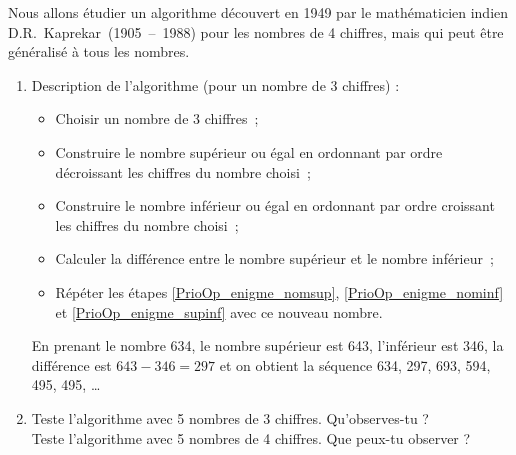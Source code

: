 \begin{enigme}

Nous allons étudier un algorithme découvert en 1949 par le mathématicien indien D.R. Kaprekar (1905 – 1988) pour les nombres de 4 chiffres, mais qui peut être généralisé à tous les nombres.

\begin{enumerate}
 \item Description de l'algorithme (pour un nombre de 3 chiffres) :
  \begin{itemize}
   \item Choisir un nombre de 3 chiffres ;
   \item Construire le nombre supérieur ou égal en ordonnant par ordre décroissant les chiffres du nombre choisi ; \label{PrioOp_enigme_nomsup}
   \item Construire le nombre inférieur ou égal en ordonnant par ordre croissant les chiffres du nombre choisi ; \label{PrioOp_enigme_nominf}
   \item Calculer la différence entre le nombre supérieur et le nombre inférieur ; \label{PrioOp_enigme_supinf}
   \item Répéter les étapes \ref{PrioOp_enigme_nomsup}, \ref{PrioOp_enigme_nominf} et \ref{PrioOp_enigme_supinf} avec ce nouveau nombre.
   \end{itemize}
   
\vspace{0.75em}

En prenant le nombre 634, le nombre supérieur est 643, l'inférieur est 346, la différence est  $643 - 346 = 297$ et on obtient la séquence 634, 297, 693, 594, 495, 495, \ldots

\vspace{1em}
   
 \item Teste l'algorithme avec 5 nombres de 3 chiffres. Qu'observes-tu ? \\[1em]
Teste l'algorithme avec 5 nombres de 4 chiffres. Que peux-tu observer ?

 \end{enumerate}
 
 \end{enigme}


